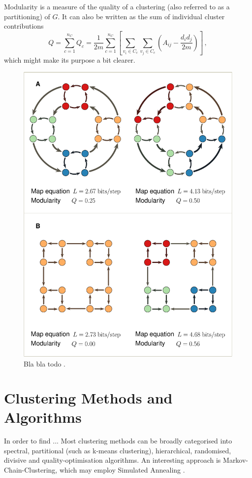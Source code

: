 \documentclass[12pt, a4paper]{article}
\begin{document}
  Modularity is a measure of the quality of a clustering (also referred to as a partitioning) of $G$. It can also be written as the sum of individual cluster contributions
  $$Q = \sum_{c=1}^{n_C} Q_c = \frac{1}{2m} \sum_{c=1}^{n_C} \left[\sum_{v_i \in C_c} \sum_{v_j \in C_c} \left(A_{ij} - \frac{d_i d_j}{2m}\right)\right]\,,$$
  which might make its purpose a bit clearer.

  \begin{figure}[H]
    \centering
    \includegraphics[width=0.5\linewidth]{figures/nice-modularity.eps}
    \caption{Bla bla todo \parencite{mapequation}.}
  \end{figure}

  \section{Clustering Methods and Algorithms}
  In order to find ...
  Most clustering methods can be broadly categorised into spectral, partitional (such as k-means clustering), hierarchical, randomised, divisive and quality-optimisation algorithms.
  An interesting approach is Markov-Chain-Clustering, which may employ Simulated Annealing \cite{fortunato}.
\end{document}
